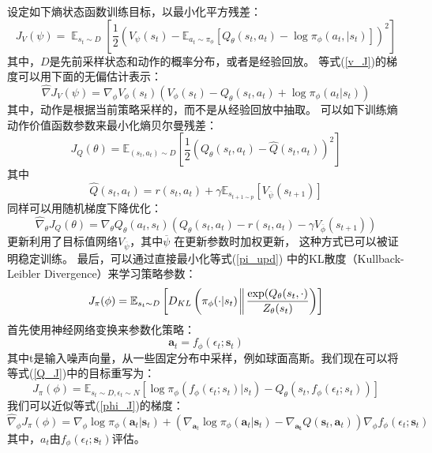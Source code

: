 \documentclass[AutoFakeBold]{LZUThesis}
\begin{document}
设定如下熵状态函数训练目标，以最小化平方残差：
\begin{equation}
  J_{V}(\psi) = \mathop{\mathbb{E}}_{s_t \sim D}
  \left[ \frac12 ( V_{\psi}(s_t) - \mathbb{E}_{a_t \sim \pi_{\phi}}
  \left[ Q_\theta(s_t, a_t) - \log \pi_{\phi}(a_t, | s_t) \right] )^2 \right]
  \label{v_J}
\end{equation}
其中，$D$是先前采样状态和动作的概率分布，或者是经验回放。
等式(\ref{v_J})的梯度可以用下面的无偏估计表示：
\begin{equation}
  \hat{\nabla} J_V(\psi) = \nabla_\phi V_\phi(s_t) 
  (V_\phi(s_t) - Q_\theta(s_t, a_t) + \log \pi_{\phi} (a_t | s_t))
\end{equation}
其中，动作是根据当前策略采样的，而不是从经验回放中抽取。
可以如下训练熵动作价值函数参数来最小化熵贝尔曼残差：
\begin{equation}
  J_Q(\theta) = \mathbb{E}_{(s_t, a_t) \sim D} \left[ 
  \frac12 (Q_\theta(s_t, a_t) - \hat{Q}(s_t, a_t))^2 \right]
\end{equation}
其中
\begin{equation}
  \hat{Q}(s_t, a_t) = r(s_t, a_t) + \gamma 
  \mathbb{E}_{s_{t + 1 \sim p}} \left[ V_{\overline{\psi}}(s_{t + 1}) \right]
\end{equation}
同样可以用随机梯度下降优化：
\begin{equation}
  \hat{\nabla}_\theta J_Q(\theta) = \nabla_\theta Q_\theta(a_t, s_t)
  (Q_\theta(s_t, a_t) - r(s_t, a_t) - \gamma V_{\overline{\phi}}(s_{t + 1}))
\end{equation}
更新利用了目标值网络$V_{\overline{\psi}}$，其中$\overline{\psi}$
在更新参数时加权更新，
这种方式已可以被证明稳定训练。
最后，可以通过直接最小化等式(\ref{pi_upd})
中的KL散度（Kullback-Leibler Divergence）来学习策略参数：
\begin{equation}
  J_\pi(\phi) = \mathbb{E}_{s_t \sim D} \left[ D_{KL} 
  \left( \pi_{\phi}(\cdot | s_t) \bigg\Arrowvert 
  \frac{\exp (Q_\theta(s_t, \cdot)}{Z_{\theta}(s_t)} \right) \right]
  \label{Q_J}
\end{equation}
首先使用神经网络变换来参数化策略：
\begin{equation}
  \mathbf{a}_t = f_{\phi}(\epsilon_t;\mathbf{s}_t)
\end{equation}
其中t是输入噪声向量，从一些固定分布中采样，例如球面高斯。我们现在可以将等式(\ref{Q_J})中的目标重写为：
\begin{equation}
  J_\pi(\phi) = \mathbb{E}_{s_t \sim D, \epsilon_t \sim N} 
  \left[ \log \pi_\phi(f_{\phi}(\epsilon_t;s_t) | s_t)
  - Q_\theta(s_t, f_\phi(\epsilon_t;s_t)) \right]
  \label{phi_J}
\end{equation}
我们可以近似等式(\ref{phi_J})的梯度：
\begin{equation}
  \hat{\nabla}_\phi J_\pi(\phi) = \nabla_\phi \log\pi_\phi(\mathbf{a}_t | \mathbf{s}_t)
  + (\nabla_{\mathbf{a}_t} \log \pi_\phi(\mathbf{a}_t | \mathbf{s}_t) - 
  \nabla_{\mathbf{a_t}}Q(\mathbf{s}_t, \mathbf{a}_t)) 
  \nabla_\phi f_\phi(\epsilon_t;\mathbf{s}_t)
\end{equation}
其中，$a_t$由$f_\phi(\epsilon_t;\mathbf{s}_t)$评估。
\end{document}
